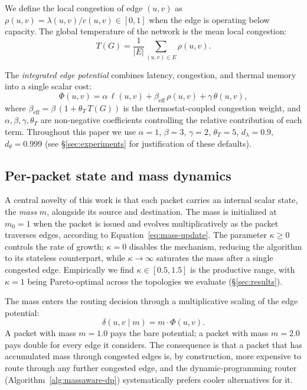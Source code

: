 We define the local congestion of edge $(u,v)$ as
$\rho(u,v) = \lambda(u,v)/c(u,v) \in [0,1]$ when the edge is
operating below capacity. The global temperature of the network
is the mean local congestion:
\begin{equation}
T(G) = \frac{1}{|E|}\sum_{(u,v)\in E}\rho(u,v).
\label{eq:global-temperature}
\end{equation}

The \emph{integrated edge potential} combines latency, congestion,
and thermal memory into a single scalar cost:
\begin{equation}
\Phi(u,v) = \alpha\,\ell(u,v)
            + \beta_{\text{eff}}\,\rho(u,v)
            + \gamma\,\theta(u,v),
\label{eq:edge-potential}
\end{equation}
where $\beta_{\text{eff}} = \beta\,(1 + \theta_T\,T(G))$ is the
thermostat-coupled congestion weight, and
$\alpha,\beta,\gamma,\theta_T$ are non-negative coefficients
controlling the relative contribution of each term. Throughout
this paper we use $\alpha=1$, $\beta=3$, $\gamma=2$,
$\theta_T=5$, $d_\lambda = 0.9$, $d_\theta=0.999$
(see \S\ref{sec:experiments} for justification of these defaults).

\subsection{Per-packet state and mass dynamics}
\label{subsec:mass-dynamics}

A central novelty of this work is that each packet carries an
internal scalar state, the \emph{mass} $m$, alongside its source
and destination. The mass is initialized at $m_0 = 1$ when the
packet is issued and evolves multiplicatively as the packet
traverses edges, according to Equation~\ref{eq:mass-update}. The
parameter $\kappa\ge 0$ controls the rate of growth; $\kappa = 0$
disables the mechanism, reducing the algorithm to its stateless
counterpart, while $\kappa \to \infty$ saturates the mass after a
single congested edge. Empirically we find
$\kappa \in [0.5, 1.5]$ is the productive range, with $\kappa=1$
being Pareto-optimal across the topologies we evaluate
(\S\ref{sec:results}).

The mass enters the routing decision through a multiplicative
scaling of the edge potential:
\begin{equation}
\delta(u,v\mid m) = m\cdot \Phi(u,v).
\label{eq:cost-step}
\end{equation}
A packet with mass $m=1.0$ pays the bare potential; a packet with
mass $m=2.0$ pays double for every edge it considers. The
consequence is that a packet that has accumulated mass through
congested edges is, by construction, more expensive to route
through any further congested edge, and the dynamic-programming
router (Algorithm~\ref{alg:massaware-dp}) systematically prefers
cooler alternatives for it.

